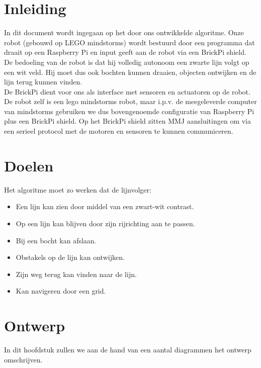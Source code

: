 \documentclass[12pt]{article}
\begin{document}
\newpage

\section{Inleiding}
	In dit document wordt ingegaan op het door ons ontwikkelde algoritme. Onze robot (gebouwd op LEGO mindstorms) wordt bestuurd door een programma dat draait op een Raspberry Pi en input geeft aan de robot via een BrickPi shield.\\
	De bedoeling van de robot is dat hij volledig autonoom een zwarte lijn volgt op een wit veld. Hij moet dus ook bochten kunnen draaien, objecten ontwijken en de lijn terug kunnen vinden.\\
	De BrickPi dient voor ons als interface met sensoren en actuatoren op de robot. De robot zelf is een lego mindstorms robot, maar i.p.v. de meegeleverde computer van mindstorms gebruiken we dus bovengenoemde configuratie van Raspberry Pi plus een BrickPi shield. Op het BrickPi shield zitten MMJ aansluitingen om via een serieel protocol met de motoren en sensoren te kunnen communiceren.
\newpage

\section{Doelen}
	Het algoritme moet zo werken dat de lijnvolger:
	\begin{itemize}
		\item Een lijn kan zien door middel van een zwart-wit contrast.
		\item Op een lijn kan blijven door zijn rijrichting aan te passen.
		\item Bij een bocht kan afslaan.
		\item Obstakels op de lijn kan ontwijken.
		\item Zijn weg terug kan vinden naar de lijn.
		\item Kan navigeren door een grid.
	\end{itemize}
\newpage
\section{Ontwerp}
	In dit hoofdstuk zullen we aan de hand van een aantal diagrammen het ontwerp omschrijven.
\end{document}
